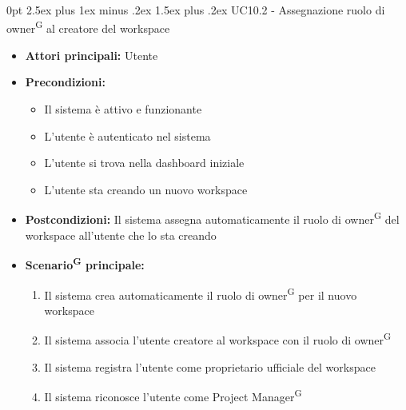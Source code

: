 \documentclass[a4paper, 11pt]{article}
\makeatletter
\renewcommand\paragraph{\@startsection{paragraph}{4}
  {0pt}
  {2.5ex plus 1ex minus .2ex}
  {1.5ex plus .2ex}
  {\normalfont\normalsize\bfseries\color{AccentDark}}}
\makeatother
\begin{document}
\paragraph{UC10.2 - Assegnazione ruolo di owner\textsuperscript{G} al creatore del workspace}\label{UC10.2}
\begin{itemize}
	\item \textbf{Attori principali:} Utente
	\item \textbf{Precondizioni:} 
	\begin{itemize}
		\item Il sistema è attivo e funzionante
		\item L'utente è autenticato nel sistema
        \item L'utente si trova nella dashboard iniziale
        \item L'utente sta creando un nuovo workspace 
	\end{itemize}
    \item \textbf{Postcondizioni:} Il sistema assegna automaticamente il ruolo di owner\textsuperscript{G} del workspace all'utente che lo sta creando
	\item \textbf{Scenario\textsuperscript{G} principale:}
    \begin{enumerate}
        \item Il sistema crea automaticamente il ruolo di owner\textsuperscript{G} per il nuovo workspace
        \item Il sistema associa l'utente creatore al workspace con il ruolo di owner\textsuperscript{G}
        \item Il sistema registra l'utente come proprietario ufficiale del workspace
        \item Il sistema riconosce l'utente come Project Manager\textsuperscript{G}
    \end{enumerate}
	
\end{itemize}
\end{document}
